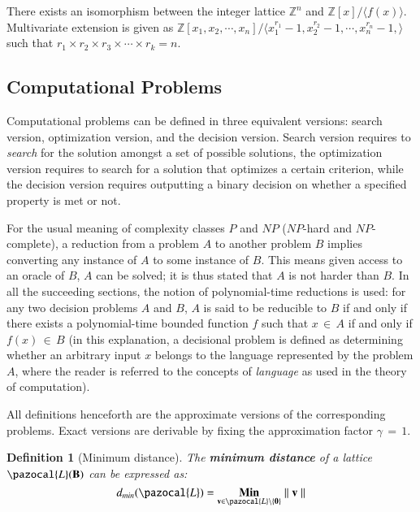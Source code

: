 \documentclass[10pt]{elsarticle}
\newtheorem{definition}{Definition}
\begin{document}
There exists an isomorphism between the integer lattice
$\mathbb{Z}^{n}$ and $\mathbb{Z}[x]/\langle f(x)\rangle$.
Multivariate extension is given as $\mathbb{Z}[x_{1}, x_{2}, \cdots,
x_{n}]/\langle x_{1}^{r_{1}} - 1, x_{2}^{r_{2}} - 1, \cdots,
x_{n}^{r_{n}} - 1,  \rangle$ such that $r_{1} \times r_{2} \times
r_{3} \times\cdots\times r_{k} = n$.


\subsection{Computational Problems}
Computational problems can be defined in three equivalent versions:
search version, optimization version, and the decision version.
Search version requires to \textit{search} for the solution amongst
a set of possible solutions, the optimization version requires to
search for a solution that optimizes a certain criterion, while the
decision version requires outputting a binary decision on whether a
specified property is met or not.

For the usual meaning of complexity classes $P$ and $NP$ ($NP$-hard
and $NP$-complete), a reduction from a problem $A$ to another
problem $B$ implies converting any instance of $A$ to some instance
of $B$. This means given access to an oracle of $B$, $A$ can be
solved; it is thus stated that $A$ is not harder than $B$. In all
the succeeding sections, the notion of polynomial-time reductions is
used: for any two decision problems $A$ and $B$, $A$ is said to be
reducible to $B$ if and only if there exists a polynomial-time
bounded function $f$ such that $x \, \in \, A$ if and only if $f(x)
\, \in \, B$ (in this explanation, a decisional problem is  defined
as determining whether an arbitrary input $x$ belongs to the
language represented by the problem $A$, where the reader is
referred to the concepts of \textit{language} as used in the theory
of computation).

All definitions henceforth are the approximate versions of the
corresponding problems. Exact versions are derivable by fixing the
approximation factor $\gamma \, = \, 1$.

\begin{definition}[Minimum distance]
 \normalfont The \textbf{minimum distance} of a lattice $\pazocal{L}(\mathbf{B})$ can be expressed as:
\begin{equation*}
 d_{min}(\pazocal{L})=\underset{\mathbf{v}\in\pazocal{L}\backslash \{\mathbf{0}\}}{\mbox{\textbf{Min}}}\parallel
\mathbf{v}\parallel
\end{equation*}
\end{definition}
\end{document}
